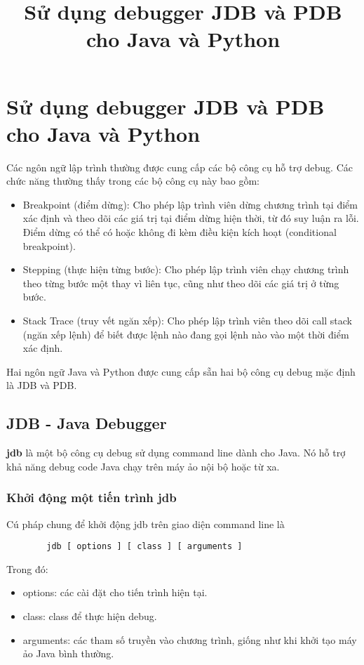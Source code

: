 \documentclass{article}
\title{Sử dụng debugger JDB và PDB cho Java và Python}
\begin{document}
    \section{Sử dụng debugger JDB và PDB cho Java và Python}

    Các ngôn ngữ lập trình thường được cung cấp các bộ công cụ hỗ trợ 
    debug. Các chức năng thường thấy trong các bộ công cụ này bao gồm:
    \begin{itemize}
        \item {Breakpoint (điểm dừng): Cho phép lập trình viên dừng 
        chương trình tại điểm xác định và theo dõi các giá trị tại điểm
        dừng hiện thời, từ đó suy luận ra lỗi. Điểm dừng có thể có hoặc
        không đi kèm điều kiện kích hoạt (conditional breakpoint).}
        \item {Stepping (thực hiện từng bước): Cho phép lập trình viên
        chạy chương trình theo từng bước một thay vì liên tục, cũng như
        theo dõi các giá trị ở từng bước.}
        \item {Stack Trace (truy vết ngăn xếp): Cho phép lập trình viên
        theo dõi call stack (ngăn xếp lệnh) để biết được lệnh nào đang
        gọi lệnh nào vào một thời điểm xác định.}
    \end{itemize}

    Hai ngôn ngữ Java và Python được cung cấp sẵn hai bộ công cụ debug
    mặc định là JDB và PDB.

    \subsection{JDB - Java Debugger}
    \textbf{jdb} là một bộ công cụ debug sử dụng command line dành cho Java.
    Nó hỗ trợ khả năng debug code Java chạy trên máy ảo nội bộ hoặc từ xa.

    \subsubsection{Khởi động một tiến trình jdb}
    Cú pháp chung để khởi động jdb trên giao diện command line là 
    \begin{verbatim}
        jdb [ options ] [ class ] [ arguments ]
    \end{verbatim}
    Trong đó:
    \begin{itemize}
        \item {options: các cài đặt cho tiến trình hiện tại.}
        \item {class: class để thực hiện debug.}
        \item {arguments: các tham số truyền vào chương trình, giống như khi
        khởi tạo máy ảo Java bình thường.}
    \end{itemize}
    
\end{document}
